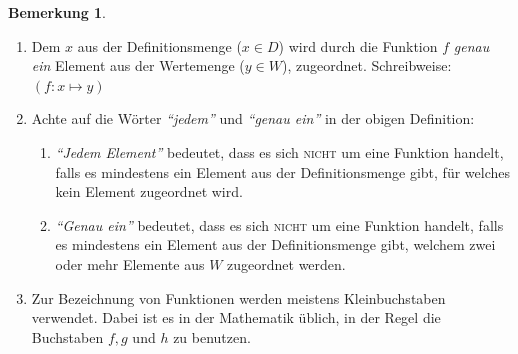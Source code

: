 \documentclass[a4paper, twoside, parskip, 10pt, smallheadings]{scrbook}
\theoremstyle{plain}
\theoremstyle{definition}
\newtheorem*{Bem}{Bemerkung}
\begin{document}
\begin{Bem}
\begin{enumerate}
\item
Dem $x$ aus der Definitionsmenge ($x \in D$) wird durch die Funktion $f$ {\it genau ein}  Element aus der
Wertemenge ($y \in W$), zugeordnet. Schreibweise: $(f: x \mapsto y)$


\item Achte auf die W\"{o}rter {\it "`jedem"'} und {\it "`genau ein"'} in der obigen
Definition:
\begin{enumerate}
\item{\it  "`Jedem Element"'} bedeutet, dass es sich \textsc{nicht}
um eine Funktion handelt, falls es mindestens ein Element aus der
Definitionsmenge gibt, f\"{u}r welches kein Element zugeordnet wird.

\item {\it  "`Genau ein"'} bedeutet, dass es sich
\textsc{nicht} um eine Funktion handelt, falls es mindestens ein
Element aus der Definitionsmenge gibt, welchem zwei oder mehr
Elemente aus $W$ zugeordnet werden.

\end{enumerate}

\item Zur Bezeichnung von Funktionen werden meistens
Kleinbuchstaben verwendet. Dabei ist es in der Mathematik \"{u}blich,
in der Regel die Buchstaben $f, g$ und $h$ zu benutzen.
\end{enumerate}
\end{Bem}
\end{document}
